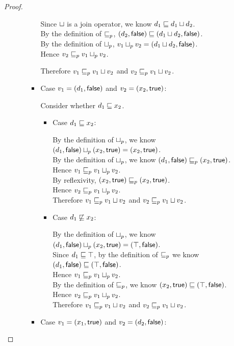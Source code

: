 \begin{proof}
\begin{enumerate}
\begin{enumerate}
\begin{itemize}
        Since $ \sqcup $ is a join operator, we know $d_1 \sqsubseteq d_1 \sqcup d_2$.\\
        By the definition of $\sqsubseteq_p$, $(d_2, \textsf{false}) \sqsubseteq (d_1 \sqcup d_2, \textsf{false})$.\\
        By the definition of $ \sqcup_p $, $v_1 \sqcup_p v_2 = (d_1 \sqcup d_2, \textsf{false})$.\\
        Hence $v_2 \sqsubseteq_p v_1 \sqcup_p v_2$. 

        Therefore $v_1 \sqsubseteq_p v_1  \sqcup  v_2$ and $v_2 \sqsubseteq_p v_1  \sqcup  v_2$. 
      \item Case $v_1 = (d_1, \textsf{false})$ and $v_2 = (x_2, \textsf{true})$:

        Consider whether $d_1 \sqsubseteq x_2$. 
        \begin{itemize}
          \item Case  $d_1 \sqsubseteq x_2$:

            By the definition of $ \sqcup_p $, we know $(d_1, \textsf{false})  \sqcup_p  (x_2, \textsf{true}) = (x_2, \textsf{true})$. \\ 
            By the definition of $ \sqcup_p $, we know $(d_1, \textsf{false}) \sqsubseteq_p (x_2, \textsf{true})$. \\ 
            Hence $v_1 \sqsubseteq_p v_1 \sqcup_p v_2$. \\ 
            By reflexivity, $(x_2, \textsf{true}) \sqsubseteq_p (x_2, \textsf{true})$. \\ 
            Hence $v_2 \sqsubseteq_p v_1 \sqcup_p v_2$. \\ 
            Therefore $v_1 \sqsubseteq_p v_1  \sqcup  v_2$ and $v_2 \sqsubseteq_p v_1  \sqcup  v_2$. 

          \item Case $d_1 \not\sqsubseteq x_2$:

            By the definition of $ \sqcup_p $, we know $(d_1, \textsf{false})  \sqcup_p  (x_2, \textsf{true}) = (\top, \textsf{false})$. \\ 
            Since $d_1 \sqsubseteq \top$, by the definition of $\sqsubseteq_p$ we know $(d_1, \textsf{false}) \sqsubseteq (\top, \textsf{false})$. \\ 
            Hence $v_1 \sqsubseteq_p v_1 \sqcup_p v_2$. \\ 
            By the definition of $\sqsubseteq_p$, we know $(x_2, \textsf{true}) \sqsubseteq (\top, \textsf{false})$. \\ 
            Hence $v_2 \sqsubseteq_p v_1 \sqcup_p v_2$. \\ 
            Therefore $v_1 \sqsubseteq_p v_1  \sqcup  v_2$ and $v_2 \sqsubseteq_p v_1  \sqcup  v_2$. 
          \end{itemize}
        \item Case $v_1 = (x_1, \textsf{true})$ and $v_2 = (d_2, \textsf{false})$: 


\end{itemize}
\end{enumerate}
\end{enumerate}
\end{proof}
